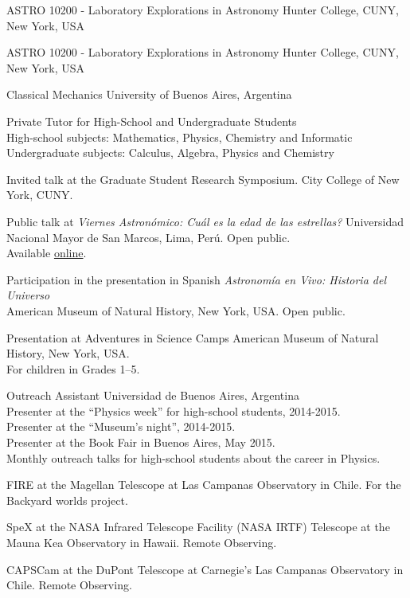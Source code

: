 \documentclass[10pt]{cv}
\newcommand\tab[1][1cm]{\hspace*{#1}}
\begin{document}
\begin{llist}
ASTRO 10200 - Laboratory Explorations in Astronomy
Hunter College, CUNY, New York, USA


ASTRO 10200 - Laboratory Explorations in Astronomy
Hunter College, CUNY, New York, USA


Classical Mechanics
University of Buenos Aires, Argentina


Private Tutor 
for High-School and Undergraduate Students\\
High-school subjects: Mathematics, Physics, Chemistry and Informatic\\
Undergraduate subjects: Calculus, Algebra, Physics and Chemistry 


Invited talk at the Graduate Student Research Symposium.	
City College of New York, CUNY.	

Public talk at \textit{Viernes Astronómico: Cu\'al es la edad de las estrellas?}
Universidad Nacional Mayor de San Marcos, Lima, Per\'u. Open public.\\
Available \href{https://www.youtube.com/watch?v=QOlgG1b41hU&ab_channel=AstronomySanMarcos}{online}.

Participation in the presentation in Spanish
\textit{Astronom\'ia en Vivo: Historia del Universo}\\
American Museum of Natural History, New York, USA. Open public.

Presentation at Adventures in Science Camps
American Museum of Natural History, New York, USA. \\
For children in Grades 1--5.

Outreach Assistant
Universidad de Buenos Aires, Argentina\\
\tab Presenter at the ``Physics week'' for high-school students, 2014-2015.\\
\tab Presenter at the ``­Museum's night'', 2014-2015.\\
\tab Presenter at the Book Fair in Buenos Aires, May 2015.\\
\tab Monthly outreach talks for high-school students about the career in Physics.


FIRE at the Magellan Telescope at Las Campanas Observatory
 in Chile. For the Backyard worlds project. 

SpeX at the NASA Infrared Telescope Facility (NASA IRTF) 	
Telescope at the Mauna Kea Observatory in Hawaii. Remote Observing. 

CAPSCam at the DuPont Telescope	
at Carnegie's Las Campanas Observatory in Chile. Remote Observing.


\end{llist}
\end{document}
